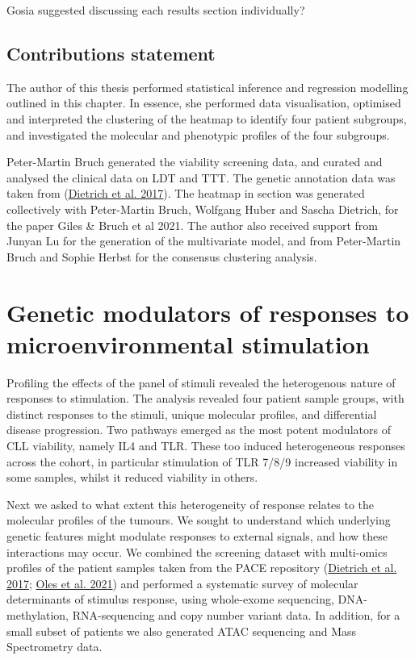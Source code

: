 \documentclass[11pt, a4paper, twosided]{book}
\begin{document}
Gosia suggested discussing each results section individually?

\hypertarget{contributions-statement}{%
\section{Contributions statement}\label{contributions-statement}}

The author of this thesis performed statistical inference and regression modelling outlined in this chapter. In essence, she performed data visualisation, optimised and interpreted the clustering of the heatmap to identify four patient subgroups, and investigated the molecular and phenotypic profiles of the four subgroups.

Peter-Martin Bruch generated the viability screening data, and curated and analysed the clinical data on LDT and TTT. The genetic annotation data was taken from (\protect\hyperlink{ref-JCIpaper}{Dietrich et al. 2017}). The heatmap in section was generated collectively with Peter-Martin Bruch, Wolfgang Huber and Sascha Dietrich, for the paper Giles \& Bruch et al 2021. The author also received support from Junyan Lu for the generation of the multivariate model, and from Peter-Martin Bruch and Sophie Herbst for the consensus clustering analysis.

\hypertarget{chapter5}{%
\chapter{Genetic modulators of responses to microenvironmental stimulation}\label{chapter5}}

Profiling the effects of the panel of stimuli revealed the heterogenous nature of responses to stimulation. The analysis revealed four patient sample groups, with distinct responses to the stimuli, unique molecular profiles, and differential disease progression. Two pathways emerged as the most potent modulators of CLL viability, namely IL4 and TLR. These too induced heterogeneous responses across the cohort, in particular stimulation of TLR 7/8/9 increased viability in some samples, whilst it reduced viability in others.

Next we asked to what extent this heterogeneity of response relates to the molecular profiles of the tumours. We sought to understand which underlying genetic features might modulate responses to external signals, and how these interactions may occur. We combined the screening dataset with multi-omics profiles of the patient samples taken from the PACE repository (\protect\hyperlink{ref-JCIpaper}{Dietrich et al. 2017}; \protect\hyperlink{ref-R-BloodCancerMultiOmics2017}{Oles et al. 2021}) and performed a systematic survey of molecular determinants of stimulus response, using whole-exome sequencing, DNA-methylation, RNA-sequencing and copy number variant data. In addition, for a small subset of patients we also generated ATAC sequencing and Mass Spectrometry data.
\end{document}
